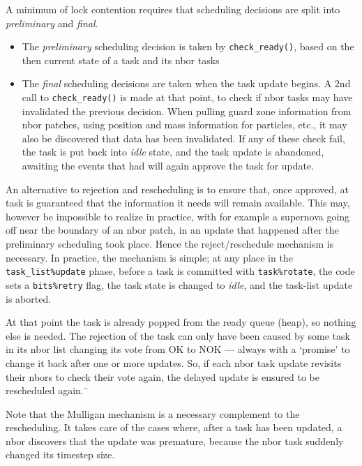 \documentclass[paper=a4,fontsize=11pt]{scrartcl}
\numberwithin{equation}{section}		%
\numberwithin{figure}{section}			%
\numberwithin{table}{section}				%
\newcommand{\codecolor}{\color{Blue}}
\newcommand{\Code}[1]{{\codecolor\texttt{#1}}}
\def\checkready{\Code{check\_ready()}}
\begin{document}
A minimum of lock contention requires that scheduling decisions are split into \textit{preliminary} and \textit{final}.
\begin{itemize}
    \item The \textit{preliminary} scheduling decision is taken by \checkready{}, based on the then current state of a task and its nbor tasks
    \item The \textit{final} scheduling decisions are taken when the task update begins. A 2nd call to \checkready{} is made at that point, to check if nbor tasks may have invalidated the previous decision.  When pulling guard zone information from nbor patches, using position and mass information for particles, etc., it may also be discovered that data has been invalidated.  If any of these check fail, the task is put back into \textit{idle} state, and the task update is abandoned, awaiting the events that had will again approve the task for update.
\end{itemize}
An alternative to rejection and rescheduling is to ensure that, once approved, at task is guaranteed that the information it needs will remain available. This may, however be impossible to realize in practice, with for example a supernova going off near the boundary of an nbor patch, in an update that happened after the preliminary scheduling took place.  Hence the reject/reschedule mechanism is necessary.  In practice, the mechanism is simple; at any place in the \verb|task_list%update| phase, before a task is committed with \verb|task%rotate|, the code sets a \verb|bits%retry| flag, the task state is changed to \textit{idle}, and the task-list update is aborted.

At that point the task is already popped from the ready queue (heap), so nothing else is needed.  The rejection of the task can only have been caused by some task in its nbor list changing its vote from OK to NOK --- always with a `promise' to change it back after one or more updates.  So, if each nbor task update revisits their nbors to check their vote again, the delayed update is ensured to be rescheduled again.¨

Note that the Mulligan mechanism is a necessary complement to the rescheduling.  It takes care of the cases where, after a task has been updated, a nbor discovers that the update was premature, because the nbor task suddenly changed its timestep size.
\end{document}
